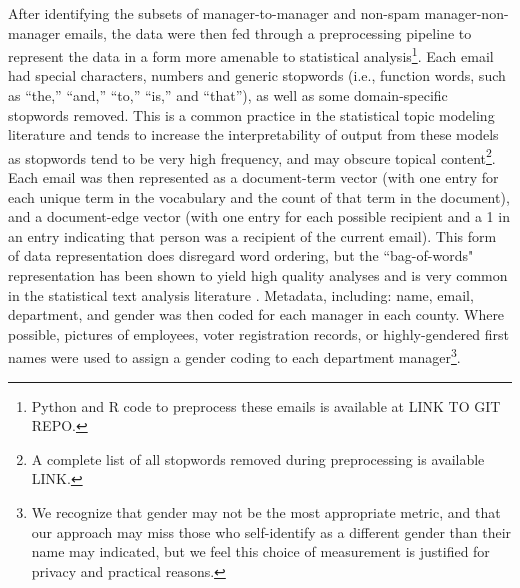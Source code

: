 \documentclass[fleqn]{MJDArticle}
\begin{document}
After identifying the subsets of manager-to-manager and non-spam manager-non-manager emails, the data were then fed through a preprocessing pipeline to represent the data in a form more amenable to statistical analysis\footnote{Python and R code to preprocess these emails is available at LINK TO GIT REPO.}. Each email had special characters, numbers and generic stopwords (i.e., function words, such as ``the,'' ``and,'' ``to,'' ``is,'' and ``that''), as well as some domain-specific stopwords removed. This is a common practice in the statistical topic modeling literature \citep{Wallach2009} and tends to increase the interpretability of output from these models as stopwords tend to be very high frequency, and may obscure topical content\footnote{A complete list of all stopwords removed during preprocessing is available LINK.}. Each email was then represented as a document-term vector (with one entry for each unique term in the vocabulary and the count of that term in the document), and a document-edge vector (with one entry for each possible recipient and a 1 in an entry indicating that person was a recipient of the current email). This form of data representation does disregard word ordering, but the ``bag-of-words" representation has been shown to yield high quality analyses and is very common in the statistical text analysis literature \citep{Grimmer2013}. Metadata, including: name, email, department, and gender was then coded for each manager in each county. Where possible, pictures of employees, voter registration records, or highly-gendered first names were used to assign a gender coding to each department manager\footnote{We recognize that gender may not be the most appropriate metric, and that our approach may miss those who self-identify as a different gender than their name may indicated, but we feel this choice of measurement is justified for privacy and practical reasons.}.
\end{document}
